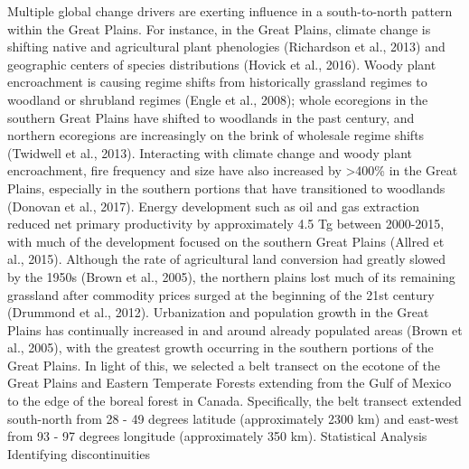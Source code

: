 \documentclass[12pt,twoside,openany]{reedthesis}
\begin{document}
Multiple global change drivers are exerting influence in a south-to-north pattern within the Great Plains. For instance, in the Great Plains, climate change is shifting native and agricultural plant phenologies (Richardson et al., 2013) and geographic centers of species distributions (Hovick et al., 2016). Woody plant encroachment is causing regime shifts from historically grassland regimes to woodland or shrubland regimes (Engle et al., 2008); whole ecoregions in the southern Great Plains have shifted to woodlands in the past century, and northern ecoregions are increasingly on the brink of wholesale regime shifts (Twidwell et al., 2013). Interacting with climate change and woody plant encroachment, fire frequency and size have also increased by \textgreater400\% in the Great Plains, especially in the southern portions that have transitioned to woodlands (Donovan et al., 2017). Energy development such as oil and gas extraction reduced net primary productivity by approximately 4.5 Tg between 2000-2015, with much of the development focused on the southern Great Plains (Allred et al., 2015). Although the rate of agricultural land conversion had greatly slowed by the 1950s (Brown et al., 2005), the northern plains lost much of its remaining grassland after commodity prices surged at the beginning of the 21st century (Drummond et al., 2012). Urbanization and population growth in the Great Plains has continually increased in and around already populated areas (Brown et al., 2005), with the greatest growth occurring in the southern portions of the Great Plains.
In light of this, we selected a belt transect on the ecotone of the Great Plains and Eastern Temperate Forests extending from the Gulf of Mexico to the edge of the boreal forest in Canada. Specifically, the belt transect extended south-north from 28 - 49 degrees latitude (approximately 2300 km) and east-west from 93 - 97 degrees longitude (approximately 350 km).
Statistical Analysis
Identifying discontinuities
\end{document}
